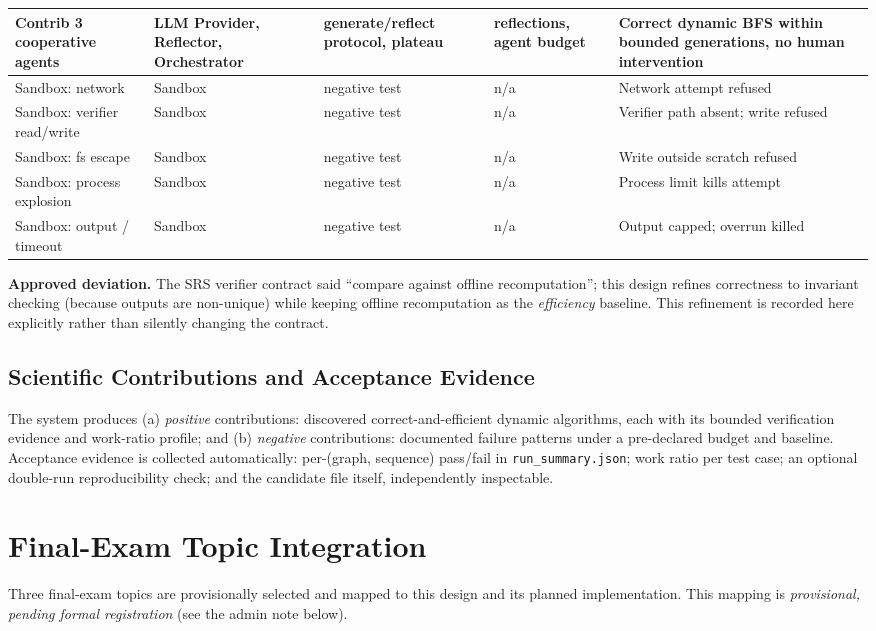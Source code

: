 \documentclass[12pt,a4paper]{article}
\begin{document}
\begin{longtable}{|p{2.7cm}|p{3.1cm}|p{2.9cm}|p{2.9cm}|p{3.2cm}|}
\hline
Contrib 3 cooperative agents & LLM Provider, Reflector, Orchestrator & generate/reflect protocol, plateau & reflections, agent budget & Correct dynamic BFS within bounded generations, no human intervention \\
\hline
Sandbox: network & Sandbox & negative test & n/a & Network attempt refused \\
\hline
Sandbox: verifier read/write & Sandbox & negative test & n/a & Verifier path absent; write refused \\
\hline
Sandbox: fs escape & Sandbox & negative test & n/a & Write outside scratch refused \\
\hline
Sandbox: process explosion & Sandbox & negative test & n/a & Process limit kills attempt \\
\hline
Sandbox: output / timeout & Sandbox & negative test & n/a & Output capped; overrun killed \\
\hline
\end{longtable}

\textbf{Approved deviation.} The SRS verifier contract said ``compare against offline recomputation''; this design refines correctness to invariant checking (because outputs are non-unique) while keeping offline recomputation as the \emph{efficiency} baseline. This refinement is recorded here explicitly rather than silently changing the contract.

\subsection{Scientific Contributions and Acceptance Evidence}

The system produces (a) \emph{positive} contributions: discovered correct-and-efficient dynamic algorithms, each with its bounded verification evidence and work-ratio profile; and (b) \emph{negative} contributions: documented failure patterns under a pre-declared budget and baseline. Acceptance evidence is collected automatically: per-(graph, sequence) pass/fail in \texttt{run\_summary.json}; work ratio per test case; an optional double-run reproducibility check; and the candidate file itself, independently inspectable.

\section{Final-Exam Topic Integration}
\label{sec:exam}

Three final-exam topics are provisionally selected and mapped to this design and its planned implementation. This mapping is \emph{provisional, pending formal registration} (see the admin note below).
\end{document}
